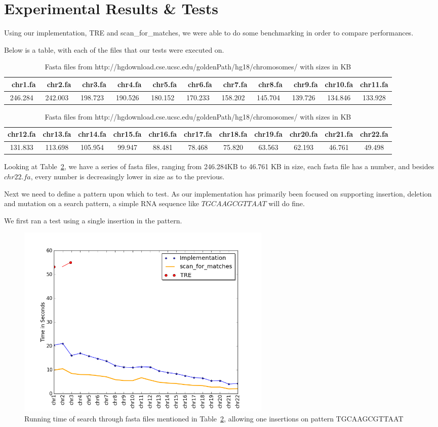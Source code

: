 \section{Experimental Results \& Tests}
Using our implementation, TRE and scan\_for\_matches, we were able to do some benchmarking in order to compare performances.

Below is a table, with each of the files that our tests were executed on.\\

\begin{table}[h!]
\begin{tabular}{ c | c | c |  c | c | c | c |  c | c | c |  c }
 ~chr1.fa & ~chr2.fa  & ~chr3.fa & ~chr4.fa & ~chr5.fa & ~chr6.fa &  ~chr7.fa & ~chr8.fa & ~chr9.fa & chr10.fa & chr11.fa \\
 \hline
246.284 & 242.003 & 198.723 & 190.526 & 180.152 & 170.233 & 158.202 & 145.704 & 139.726 & 134.846 & 133.928
\end{tabular}
\begin{tabular}{ c | c | c |  c | c | c | c |  c | c | c |  c }
chr12.fa & chr13.fa & chr14.fa & chr15.fa & chr16.fa & chr17.fa & chr18.fa & chr19.fa & chr20.fa & chr21.fa & chr22.fa\\
\hline
131.833 & 113.698 & 105.954 & 99.947 & 88.481 & 78.468 & 75.820 & 63.563 & 62.193 & 46.761 & 49.498
\end{tabular}
\caption{Fasta files from http://hgdownload.cse.ucsc.edu/goldenPath/hg18/chromosomes/ with sizes in KB}
\label{tab:sizes}
\end{table}
Looking at Table~\ref{tab:sizes}, we have a series of fasta files, ranging from 246.284KB to 46.761 KB in size, each fasta file has a number, and besides $chr22.fa$, every number is decreasingly lower in size as to the previous.

Next we need to define a pattern upon which to test. As our implementation has primarily been focused on supporting insertion, deletion and mutation on a search pattern, a simple RNA sequence like $TGCAAGCGTTAAT$ will do fine.

We first ran a test using a single insertion in the pattern.
\begin{figure}[h!]
\centering
\includegraphics[width=0.6\textwidth]{Benchmarking/1ins.png}
\caption{Running time of search through fasta files mentioned in Table~\ref{tab:sizes},  allowing one insertions on pattern TGCAAGCGTTAAT}
\label{fig:ins1}
\end{figure}

